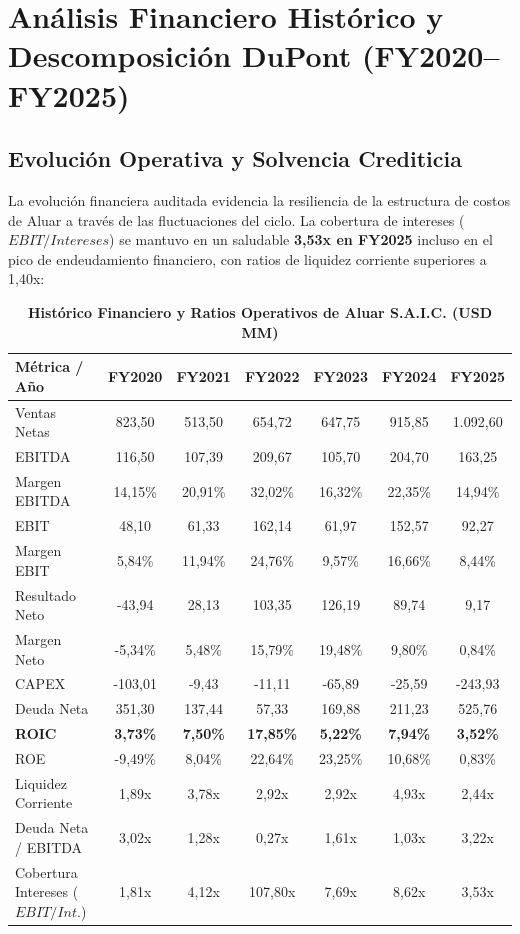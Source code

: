 \documentclass[10pt,a4paper]{article}
\begin{document}
\section{Análisis Financiero Histórico y Descomposición DuPont (FY2020--FY2025)}

\subsection{Evolución Operativa y Solvencia Crediticia}
La evolución financiera auditada evidencia la resiliencia de la estructura de costos de Aluar a través de las fluctuaciones del ciclo. La cobertura de intereses ($EBIT/Intereses$) se mantuvo en un saludable \textbf{3,53x en FY2025} incluso en el pico de endeudamiento financiero, con ratios de liquidez corriente superiores a 1,40x:

\begin{table}[H]
\centering
\caption{\textbf{Histórico Financiero y Ratios Operativos de Aluar S.A.I.C. (USD MM)}}
\scriptsize
\begin{tabularx}{\textwidth}{Xcccccc}
\toprule
\textbf{Métrica / Año} & \textbf{FY2020} & \textbf{FY2021} & \textbf{FY2022} & \textbf{FY2023} & \textbf{FY2024} & \textbf{FY2025} \\
\midrule
Ventas Netas & 823,50 & 513,50 & 654,72 & 647,75 & 915,85 & 1.092,60 \\
EBITDA & 116,50 & 107,39 & 209,67 & 105,70 & 204,70 & 163,25 \\
Margen EBITDA & 14,15\% & 20,91\% & 32,02\% & 16,32\% & 22,35\% & 14,94\% \\
EBIT & 48,10 & 61,33 & 162,14 & 61,97 & 152,57 & 92,27 \\
Margen EBIT & 5,84\% & 11,94\% & 24,76\% & 9,57\% & 16,66\% & 8,44\% \\
Resultado Neto & -43,94 & 28,13 & 103,35 & 126,19 & 89,74 & 9,17 \\
Margen Neto & -5,34\% & 5,48\% & 15,79\% & 19,48\% & 9,80\% & 0,84\% \\
CAPEX & -103,01 & -9,43 & -11,11 & -65,89 & -25,59 & -243,93 \\
Deuda Neta & 351,30 & 137,44 & 57,33 & 169,88 & 211,23 & 525,76 \\
\midrule
\textbf{ROIC} & \textbf{3,73\%} & \textbf{7,50\%} & \textbf{17,85\%} & \textbf{5,22\%} & \textbf{7,94\%} & \textbf{3,52\%} \\
ROE & -9,49\% & 8,04\% & 22,64\% & 23,25\% & 10,68\% & 0,83\% \\
Liquidez Corriente & 1,89x & 3,78x & 2,92x & 2,92x & 4,93x & 2,44x \\
Deuda Neta / EBITDA & 3,02x & 1,28x & 0,27x & 1,61x & 1,03x & 3,22x \\
Cobertura Intereses ($EBIT/Int.$) & 1,81x & 4,12x & 107,80x & 7,69x & 8,62x & 3,53x \\
\bottomrule
\end{tabularx}
\end{table}
\end{document}
